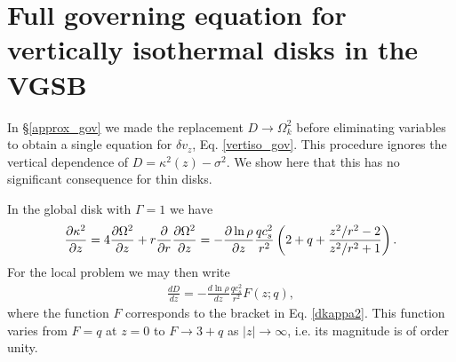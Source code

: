 \section{Full governing equation for vertically isothermal disks in
  the VGSB}\label{adia_improve}

In \S\ref{approx_gov} we made the replacement $D\to\Omega_k^2$ before
eliminating variables to obtain a single equation for $\delta v_z$,
Eq. \ref{vertiso_gov}.  This procedure ignores the vertical dependence of
$D=\kappa^2(z) - \sigma^2$. We show here that this has no significant
consequence for thin disks. 

In the global disk with $\Gamma=1$ we have
\begin{align}\label{dkappa2}
  \frac{\partial\kappa^2}{\partial z} = 4 \frac{\partial\Omega^2}{\partial z} + r\frac{\partial}{\partial
    r}\frac{\partial\Omega^2}{\partial z} = -
  \frac{\partial\ln\rho}{\partial z}\frac{qc_s^2}{r^2} \left(2 + q +
    \frac{z^2/r^2-2}{z^2/r^2+1}\right). 
\end{align}
For the local problem we may then write
\begin{align}
  \frac{dD}{dz}  = - \frac{d\ln\rho}{dz}\frac{qc_s^2}{r^2}F(z;q),
\end{align}
where the function $F$ corresponds to the bracket in
Eq. \ref{dkappa2}. This function varies from $F=q$ at $z=0$ to $F\to
3+q$ as $|z|\to\infty$, i.e. its magnitude is of order unity. 

